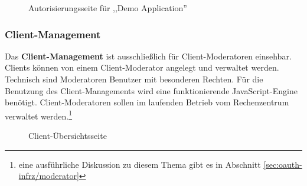 \documentclass[12pt,a4paper,pointednumbers,abstracton]{scrartcl}
\begin{document}
\begin{figure}[h!]
\centering
{}
\caption{Autorisierungsseite für ,,Demo Application''}
\label{pic:oauth_infrz/authorize}
\end{figure}

\subsubsection{Client-Management}

Das \textbf{Client-Management} ist ausschließlich für Client-Moderatoren einsehbar.
Clients können von einem Client-Moderator angelegt und verwaltet werden.
Technisch sind Moderatoren Benutzer mit besonderen Rechten.
Für die Benutzung des Client-Managements wird eine funktionierende JavaScript-Engine benötigt.
Client-Moderatoren sollen im laufenden Betrieb vom Rechenzentrum verwaltet werden.\footnote{eine ausführliche Diskussion zu diesem Thema gibt es in Abschnitt \ref{sec:oauth-infrz/moderator}}


\begin{figure}[h!]
\centering
{}
\caption{Client-Übersichtsseite}
\label{pic:oauth_infrz/clients_overview}
\end{figure}
\end{document}

